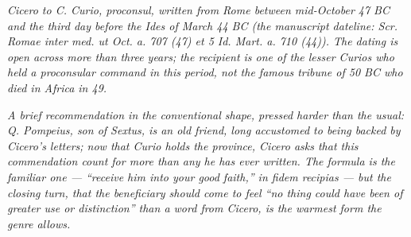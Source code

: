 
\textit{Cicero to C. Curio, proconsul, written from Rome
between mid-October 47 BC and the third day before the
Ides of March 44 BC (the manuscript dateline:
\textit{Scr. Romae inter med. ut Oct. a. 707 (47) et 5
Id. Mart. a. 710 (44)}). The dating is open across more
than three years; the recipient is one of the lesser
Curios who held a proconsular command in this period,
not the famous tribune of 50 BC who died in Africa in
49.}

\textit{A brief recommendation in the conventional shape,
pressed harder than the usual: Q. Pompeius, son of
Sextus, is an old friend, long accustomed to being
backed by Cicero's letters; now that Curio holds the
province, Cicero asks that this commendation count for
more than any he has ever written. The formula is the
familiar one --- ``receive him into your good faith,''
\textit{in fidem recipias} --- but the closing turn,
that the beneficiary should come to feel ``no thing
could have been of greater use or distinction'' than a
word from Cicero, is the warmest form the genre allows.}
